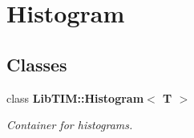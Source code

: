 \section{Histogram}
\label{group__Histogram}
\subsection*{Classes}
\begin{CompactItemize}
\item 
class {\bf Lib\-TIM::Histogram$<$ T $>$}
\begin{CompactList}\small\item\em Container for histograms. \item\end{CompactList}\end{CompactItemize}
